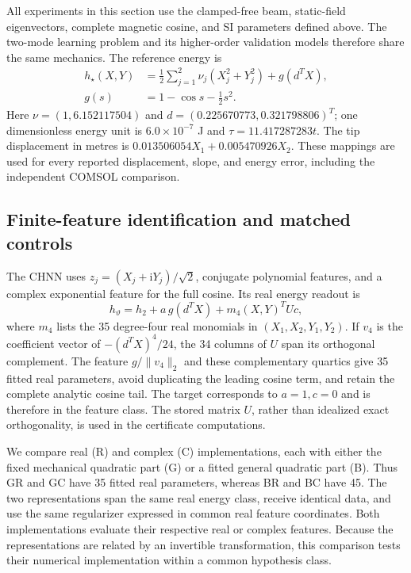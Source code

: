 \label{sec:unified-experiments}

All experiments in this section use the clamped-free beam, static-field
eigenvectors, complete magnetic cosine, and SI parameters defined above.
The two-mode learning problem and its higher-order validation models therefore
share the same mechanics. The reference energy is
\begin{equation}
 \begin{aligned}
 h_\star(X,Y)&=\frac12\sum_{j=1}^2\nu_j(X_j^2+Y_j^2)+g(d^TX),\\
 g(s)&=1-\cos s-\frac12s^2 .
 \end{aligned}
 \label{eq:unified-reference-energy}
\end{equation}
Here $\nu=(1,6.152117504)$ and
$d=(0.225670773,0.321798806)^T$; one dimensionless energy unit is
$6.0\times10^{-7}$ J and $\tau=11.417287283t$.
The tip displacement in metres is
$0.013506054X_1+0.005470926X_2$.
These mappings are used for every reported displacement, slope, and energy
error, including the independent COMSOL comparison.

\subsection{Finite-feature identification and matched controls}
\label{sec:unified-learning-protocol}
The CHNN uses $z_j=(X_j+\mathrm{i}Y_j)/\sqrt2$, conjugate polynomial
features, and a complex exponential feature for the full cosine.
Its real energy readout is
\begin{equation}
 h_\vartheta=h_2+a\,g(d^TX)+m_4(X,Y)^TUc,
 \label{eq:unified-feature-readout}
\end{equation}
where $m_4$ lists the 35 degree-four real monomials in $(X_1,X_2,Y_1,Y_2)$.
If $v_4$ is the coefficient vector of $-(d^TX)^4/24$, the 34 columns of
$U$ span its orthogonal complement. The feature $g/\|v_4\|_2$ and
these complementary quartics give 35 fitted real parameters, avoid
duplicating the leading cosine term, and retain the complete analytic
cosine tail. The target corresponds to $a=1,c=0$ and is therefore in the
feature class. The stored matrix $U$, rather than idealized exact
orthogonality, is used in the certificate computations.

We compare real (R) and complex (C) implementations, each with either the
fixed mechanical quadratic part (G) or a fitted general quadratic part (B).
Thus GR and GC have 35 fitted real parameters, whereas BR and BC have 45.
The two representations span the same real energy class, receive identical
data, and use the same regularizer expressed in common real feature coordinates.
Both implementations evaluate their respective real or complex features.
Because the representations are related by an invertible transformation,
this comparison tests their numerical implementation within a common
hypothesis class.

